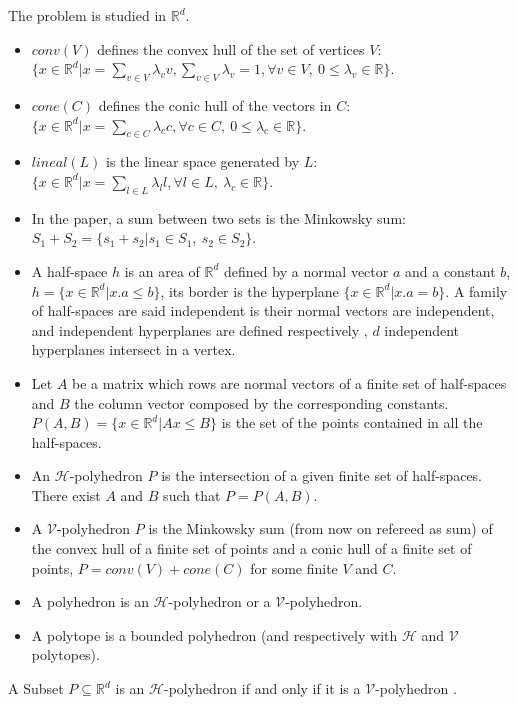 \begin{definition}
	The problem is studied in $\mathbb{R}^d$.
	\begin{itemize}
	\item $conv(V)$ defines the convex hull of the set of vertices $V$: $\{ x\in\mathbb{R}^d| x=\sum_{v\in V} \lambda_v v, \sum_{v\in V} \lambda_v =1, \forall v \in V, \ 0\leq \lambda_v \in \mathbb{R} \}$.
	\item $cone(C)$ defines the conic hull of the vectors in $C$: $\{ x\in\mathbb{R}^d| x=\sum_{c\in C} \lambda_c c, \forall c \in C,\ 0\leq \lambda_c \in \mathbb{R} \}$.
	\item $lineal(L)$ is the linear space generated by $L$: $\{ x\in\mathbb{R}^d| x=\sum_{l\in L} \lambda_l l, \forall l \in L,\ \lambda_c \in \mathbb{R} \}$. 
	\item In the paper, a sum between two sets is the Minkowsky sum: $S_1+S_2=\{s_1+s_2|s_1\in S_1,\ s_2 \in S_2 \}$.
	\item A half-space $h$ is an area of $\mathbb{R}^d$ defined by a normal vector $a$ and a constant $b$, $h=\{x\in\mathbb{R}^d|x.a\leq b\}$, its border is the hyperplane $\{x\in\mathbb{R}^d|x.a = b\}$. A family of half-spaces are said independent is their normal vectors are independent, and independent hyperplanes are defined respectively , $d$ independent hyperplanes intersect in a vertex.
	\item Let $A$ be a matrix which rows are normal vectors of a finite set of half-spaces and $B$ the column vector composed by the corresponding constants. $P(A,B)=\{x\in\mathbb{R}^d|Ax\leq B\}$ is the set of the points contained in all the half-spaces.
	\item An $\mathcal{H}$-polyhedron $P$ is the intersection of a given finite set of half-spaces. There exist $A$ and $B$ such that $P=P(A,B)$.
	\item A $\mathcal{V}$-polyhedron $P$ is the Minkowsky sum (from now on refereed as sum) of the convex hull of a finite set of points and a conic hull of a finite set of points, $P=conv(V)+cone(C)$ for some finite $V$ and $C$.
	\item A polyhedron is an $\mathcal{H}$-polyhedron or a $\mathcal{V}$-polyhedron.
	\item A polytope is a bounded polyhedron (and respectively with $\mathcal{H}$ and $\mathcal{V}$ polytopes).
	\end{itemize}
\end{definition}
 

\begin{theorem}
A Subset $P\subseteq\mathbb{R}^d$ is an $\mathcal{H}$-polyhedron if and only if it is a $\mathcal{V}$-polyhedron \cite{ziegler_polytopes}.
\label{thm_representation}
\end{theorem} 


